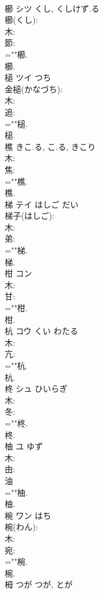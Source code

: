 \documentclass[8pt]{extreport}
\begin{document}
\begin{CJK}{UTF8}{min}
\\	櫛	シツ	くし, くしけず.る		
\\	櫛(くし): 
\\	木: 
\\	節: 
\\	=""櫛.
\\	櫛.
\\	槌	ツイ	つち		
\\	金槌(かなづち): 
\\	木: 
\\	追: 
\\	=""槌.
\\	槌.
\\	樵		きこ.る, こ.る, きこり				
\\	木: 
\\	焦: 
\\	=""樵.
\\	樵.
\\	梯	テイ	はしご	だい	
\\	梯子(はしご): 
\\	木: 
\\	弟: 
\\	=""梯.
\\	梯.
\\	柑	コン			
\\	木: 
\\	甘: 
\\	=""柑.
\\	柑.
\\	杭	コウ	くい	わたる	
\\	木: 
\\	亢: 
\\	=""杭.
\\	杭.
\\	柊	シュ	ひいらぎ		
\\	木: 
\\	冬: 
\\	=""柊.
\\	柊.
\\	柚	ユ	ゆず		
\\	木: 
\\	由: 
\\	油 
\\	=""柚.
\\	柚.
\\	椀	ワン	はち		
\\	椀(わん): 
\\	木: 
\\	宛: 
\\	=""椀.
\\	椀.
\\	栂	つが	つが, とが		

\end{CJK}
\end{document}
